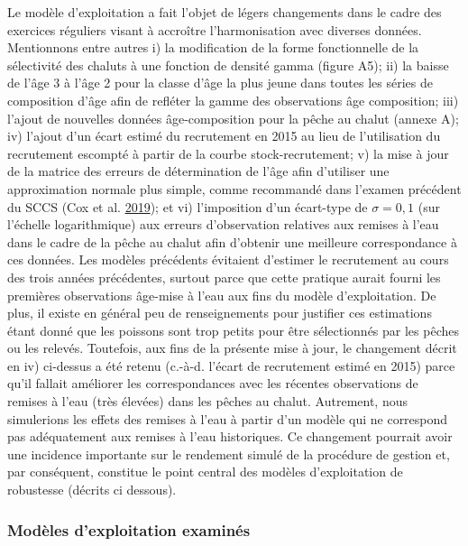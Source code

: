 \documentclass[11pt]{book}
\begin{document}
Le modèle d'exploitation a fait l'objet de légers changements dans le cadre des exercices réguliers visant à accroître l'harmonisation avec diverses données. Mentionnons entre autres i) la modification de la forme fonctionnelle de la sélectivité des chaluts à une fonction de densité gamma (figure A5); ii) la baisse de l'âge 3 à l'âge 2 pour la classe d'âge la plus jeune dans toutes les séries de composition d'âge afin de refléter la gamme des observations âge composition; iii) l'ajout de nouvelles données âge-composition pour la pêche au chalut (annexe A); iv) l'ajout d'un écart estimé du recrutement en 2015 au lieu de l'utilisation du recrutement escompté à partir de la courbe stock-recrutement; v) la mise à jour de la matrice des erreurs de détermination de l'âge afin d'utiliser une approximation normale plus simple, comme recommandé dans l'examen précédent du SCCS (Cox et al. \protect\hyperlink{ref-cox2019evaluating}{2019}); et vi) l'imposition d'un écart-type de \(\sigma = 0,1\) (sur l'échelle logarithmique) aux erreurs d'observation relatives aux remises à l'eau dans le cadre de la pêche au chalut afin d'obtenir une meilleure correspondance à ces données. Les modèles précédents évitaient d'estimer le recrutement au cours des trois années précédentes, surtout parce que cette pratique aurait fourni les premières observations âge-mise à l'eau aux fins du modèle d'exploitation. De plus, il existe en général peu de renseignements pour justifier ces estimations étant donné que les poissons sont trop petits pour être sélectionnés par les pêches ou les relevés. Toutefois, aux fins de la présente mise à jour, le changement décrit en iv) ci-dessus a été retenu (c.-à-d. l'écart de recrutement estimé en 2015) parce qu'il fallait améliorer les correspondances avec les récentes observations de remises à l'eau (très élevées) dans les pêches au chalut. Autrement, nous simulerions les effets des remises à l'eau à partir d'un modèle qui ne correspond pas adéquatement aux remises à l'eau historiques. Ce changement pourrait avoir une incidence importante sur le rendement simulé de la procédure de gestion et, par conséquent, constitue le point central des modèles d'exploitation de robustesse (décrits ci dessous).

\hypertarget{moduxe8les-dexploitation-examinuxe9s}{%
\subsubsection{Modèles d'exploitation examinés}\label{moduxe8les-dexploitation-examinuxe9s}}
\end{document}
